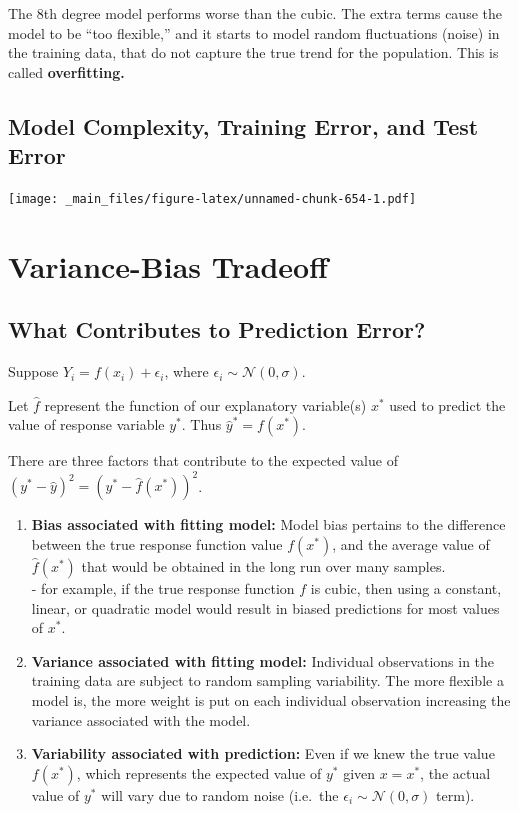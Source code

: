 \documentclass[]{book}
\begin{document}
The 8th degree model performs worse than the cubic. The extra terms
cause the model to be ``too flexible,'' and it starts to model random
fluctuations (noise) in the training data, that do not capture the true
trend for the population. This is called \textbf{overfitting.}

\subsection{Model Complexity, Training Error, and Test
Error}\label{model-complexity-training-error-and-test-error}

\texttt{[image: \_main\_files/figure-latex/unnamed-chunk-654-1.pdf]}

\section{Variance-Bias Tradeoff}\label{variance-bias-tradeoff}

\subsection{What Contributes to Prediction
Error?}\label{what-contributes-to-prediction-error}

Suppose \(Y_i = f(x_i) + \epsilon_i\), where
\(\epsilon_i\sim\mathcal{N}(0,\sigma)\).

Let \(\hat{f}\) represent the function of our explanatory variable(s)
\(x^*\) used to predict the value of response variable \(y^*\). Thus
\(\hat{y}^* = f(x^*)\).

There are three factors that contribute to the expected value of
\(\left(y^* - \hat{y}\right)^2 = \left(y^* - \hat{f}(x^*)\right)^2\).

\begin{enumerate}
\def\labelenumi{\arabic{enumi}.}
\item
  \textbf{Bias associated with fitting model:} Model bias pertains to
  the difference between the true response function value \(f(x^*)\),
  and the average value of \(\hat{f}(x^*)\) that would be obtained in
  the long run over many samples.\\
  - for example, if the true response function \(f\) is cubic, then
  using a constant, linear, or quadratic model would result in biased
  predictions for most values of \(x^*\).
\item
  \textbf{Variance associated with fitting model:} Individual
  observations in the training data are subject to random sampling
  variability. The more flexible a model is, the more weight is put on
  each individual observation increasing the variance associated with
  the model.
\item
  \textbf{Variability associated with prediction:} Even if we knew the
  true value \(f(x^*)\), which represents the expected value of \(y^*\)
  given \(x=x^*\), the actual value of \(y^*\) will vary due to random
  noise (i.e.~the \(\epsilon_i\sim\mathcal{N}(0,\sigma)\) term).
\end{enumerate}
\end{document}

